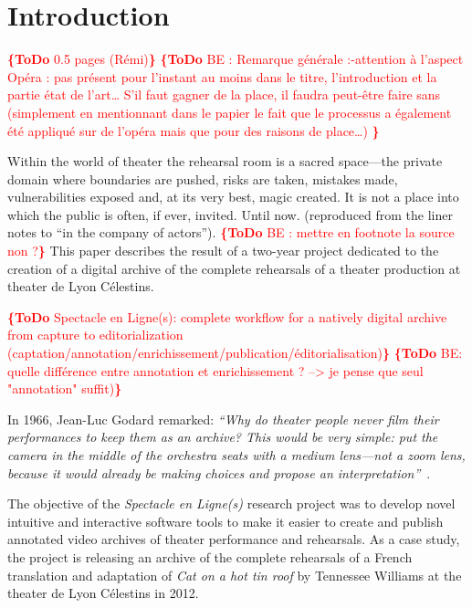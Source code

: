 \documentclass[conference]{IEEEtran}
\newcommand{\todo}[1]{\noindent\textcolor{red}{{\bf \{ToDo} #1{\bf \}}}}
\begin{document}
%
\IEEEpeerreviewmaketitle



\section{Introduction}

\todo{0.5 pages (Rémi)}
\todo{BE : Remarque générale :-attention à l’aspect Opéra : pas présent pour l’instant au moins dans le titre, l’introduction et la partie état de l’art… S’il faut gagner de la place, il faudra peut-être faire sans (simplement en mentionnant dans le papier le fait que le processus a également été appliqué sur de l’opéra mais que pour des raisons de place…) }

Within the world of theater the rehearsal room is a sacred space---the private domain where boundaries are pushed, risks are taken, mistakes made, vulnerabilities exposed and, at its very best, magic created. It is not a place into which the public is often, if ever, invited. Until now. (reproduced from the liner notes to ``in the company of actors'').
\todo{BE : mettre en footnote la source non ?}
 This paper describes the result of a two-year project dedicated to the creation of a digital archive  of  the complete  rehearsals of a theater production at theater de Lyon Célestins.

\todo{Spectacle en Ligne(s): complete workflow for a natively digital archive from capture to editorialization
(captation/annotation/enrichissement/publication/éditorialisation)}
\todo{BE: quelle différence entre annotation et enrichissement ? --> je pense que seul "annotation" suffit)}

In 1966, Jean-Luc Godard remarked: {\em ``Why do theater people never film their performances to keep  them as an archive? This would be very simple: put the camera in the middle of the orchestra seats with a medium lens---not a zoom lens, because it would already be making choices and propose an interpretation''}~\cite{Godard66}.

The objective of the \emph{Spectacle en Ligne(s)} research project was to develop novel intuitive and interactive software tools to make it easier to 
create and publish annotated video archives of theater performance and rehearsals. As a case study, the project is releasing an archive of 
the complete rehearsals of a French translation and adaptation of \emph{Cat on a hot tin roof} by Tennessee Williams at the theater de Lyon Célestins
in 2012. 
\end{document}
